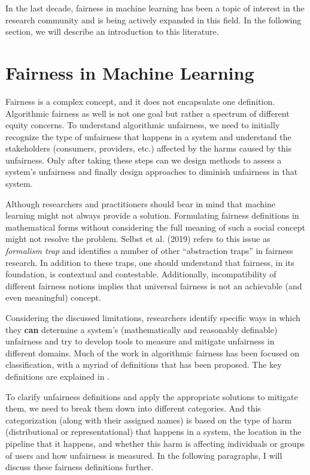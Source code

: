     In the last decade, fairness in machine learning has been a topic of interest in the research community and is being actively expanded in this field. In the following section, we will describe an introduction to this literature.

\section{Fairness in Machine Learning}
\label{sec:fair_ml}
    
    Fairness is a complex concept, and it does not encapsulate one definition. Algorithmic fairness as well is not one goal but rather a spectrum of different equity concerns. To understand algorithmic unfairness, we need to initially recognize the type of unfairness that happens in a system and understand the stakeholders (consumers, providers, etc.) affected by the harms caused by this unfairness. Only after taking these steps can we design methods to assess a system's unfairness and finally design approaches to diminish unfairness in that system.
    
    Although researchers and practitioners should bear in mind that machine learning might not always provide a solution. Formulating fairness definitions in mathematical forms without considering the full meaning of such a social concept might not resolve the problem. Selbst et al. (2019) \cite{selbst2019fairness} refers to this issue as \textit{formalism trap} and identifies a number of other ``abstraction traps'' in fairness research. In addition to these traps, one should understand that fairness, in its foundation, is contextual and contestable. Additionally, incompatibility of different fairness notions \cite{friedler-impossibility-2021} implies that universal fairness is not an achievable (and even meaningful) concept.
    
    Considering the discussed limitations, researchers identify specific ways in which they \textbf{can} determine a system's (mathematically and reasonably definable) unfairness and try to develop tools to measure and mitigate unfairness in different domains. Much of the work in algorithmic fairness has been focused on classification, with a myriad of definitions that has been proposed. The key definitions are explained in \cite{mitchell2021algorithmic,barocas2016big,barocas2018fairness}.
    
    To clarify unfairness definitions and apply the appropriate solutions to mitigate them, we need to break them down into different categories. And this categorization (along with their assigned names) is based on the type of harm (distributional or representational) that happens in a system, the location in the pipeline that it happens, and whether this harm is affecting individuals or groups of users and how unfairness is measured. In the following paragraphs, I will discuss these fairness definitions further.

